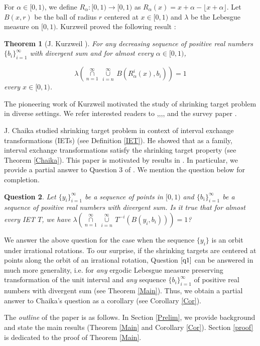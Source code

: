 \documentclass[11pt, english, reqno]{amsart}
\newtheorem{theorem}{Theorem}[section]
\newtheorem{question}[theorem]{Question}
\theoremstyle{definition}
\theoremstyle{remark}
\numberwithin{equation}{section}
\numberwithin{equation}{section}
\newcommand{\Leb}{\ensuremath{\lambda}}
\newcommand{\LS}{\ensuremath{\underset{n=1}{\overset{\infty}{\cap}} \, {\underset{i=n}{\overset{\infty}{\cup}}}\,}}
\begin{document}
For $\alpha \in [0,1)$, we define $R_{\alpha} \colon [0,1) \to[0,1)$ as $R_{\alpha}(x)=x+\alpha-\lfloor x+\alpha \rfloor$. Let $B(x,r)$ be the ball of radius $r$ centered at $x \in [0,1)$ and $\lambda$ be the Lebesgue measure on $[0,1)$. Kurzweil proved the following result :

\begin{theorem}[J. Kurzweil \cite{Kurzweil_1955}]  For any decreasing sequence of positive real numbers $\{b_i\}_{i=1}^{\infty}$ with divergent sum and for almost every $\alpha \in [0,1)$,

$$\Leb\left(\LS B(R_{\alpha}^i(x),b_i)\right)=1 $$ every $x \in [0,1)$.
\end{theorem} The pioneering work of Kurzweil motivated the study of shrinking target problem in diverse settings. We refer interested readers to \cite{Chernov_Kleinbock_2001},\cite{Maucourant_2006},\cite{Kim_2007},\cite{Galatolo_Kim_2007},\cite{Fernandez_Melian_Pestana_2012} and the survey paper \cite{Athreya_2009}. 

J. Chaika \cite{Chaika_2011} studied shrinking target problem in context of interval exchange transformations (IETs) (see Definition \ref{IET}). He showed that as a family, interval exchange transformations satisfy the shrinking target property (see Theorem \ref{Chaika}). This paper is motivated by results in \cite{Chaika_2011}. In particular, we provide a partial answer to Question $3$ of \cite{Chaika_2011}. We mention the question below for completion.

\begin{question}\label{q1} Let $\{y_i\}_{i=1}^{\infty} $ be a sequence of points in $ [0,1)$ and $\{b_i\}_{i=1}^{\infty}$ be a sequence of positive real numbers with divergent sum. Is it true that for almost every IET $T$, we have $\Leb(\LS T^{-i}(B(y_i,b_i)))=1$?
\end{question}

We answer the above question for the case when the sequence $\{y_i\}$ is an orbit under irrational rotations. To our surprise, if the shrinking targets are centered at points along the orbit of an irrational rotation, Question $\ref{q1}$ can be answered in much more generality, i.e. for \textit{any} ergodic Lebesgue measure preserving transformation of the unit interval and \textit{any} sequence $\{b_i\}_{i=1}^{\infty}$ of positive real numbers with divergent sum (see Theorem \ref{Main}). Thus, we obtain a partial answer to Chaika's question as a corollary (see Corollary \ref{Cor}). 

The \textit{outline} of the paper is as follows. In 
Section \ref{Prelim}, we provide background and state the main results (Theorem \ref{Main} and Corollary \ref{Cor}). Section \ref{proof} is dedicated to the proof of Theorem \ref{Main}. 
\end{document}
